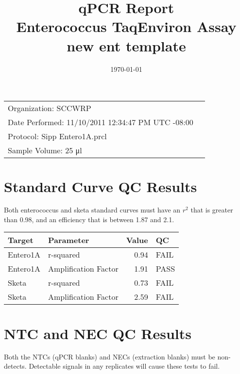 \documentclass{article}\usepackage[]{graphicx}\usepackage[]{color}
\title{qPCR Report \\ Enterococcus TaqEnviron Assay \\ new ent template} %
\date{\today} %
\author{}
\begin{document}
\maketitle

\begin{center}
\begin{tabular}{l r}
Organization: SCCWRP \\
Date Performed: 11/10/2011 12:34:47 PM UTC -08:00 \\ %
Protocol: Sipp Entero1A.prcl \\
Sample Volume: 25 \si{\micro\litre}
\end{tabular}
\end{center}


\section{Standard Curve QC Results}

Both enterococcus and sketa standard curves must have an $r^2$ that is greater than 0.98,
and an efficiency that is between 1.87 and 2.1. \\

\begin{table}[ht]
\centering
\begin{tabular}{llrl}
  \hline
Target & Parameter & Value & QC \\ 
  \hline
Entero1A & r-squared & 0.94 & FAIL \\ 
  Entero1A & Amplification Factor & 1.91 & PASS \\ 
  Sketa & r-squared & 0.73 & FAIL \\ 
  Sketa & Amplification Factor & 2.59 & FAIL \\ 
   \hline
\end{tabular}
\end{table}



\section{NTC and NEC QC Results}

Both the NTCs (qPCR blanks) and NECs (extraction blanks) must be non-detects. Detectable signals
in any replicates will cause these tests to fail. \\
\end{document}
